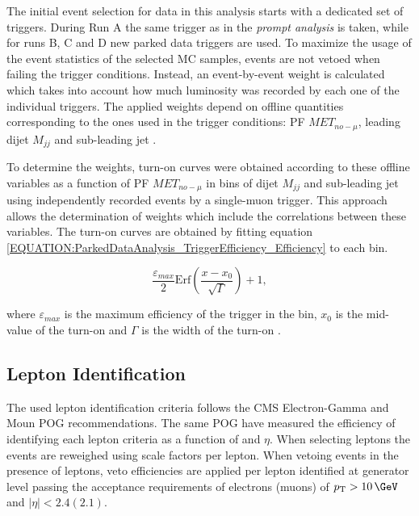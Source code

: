 
The initial event selection for data in this analysis starts with a dedicated set of triggers. During Run A the same trigger as in the \textit{prompt analysis} is taken, while for runs B, C and D new parked data triggers are used. To maximize the usage of the event statistics of the selected \gls{MC} samples, events are not vetoed  when failing the trigger conditions. Instead, an event-by-event weight is calculated which takes into account how much luminosity was recorded by each one of the individual triggers. The applied weights depend on offline quantities corresponding to the ones used in the trigger conditions: \gls{PF} $MET_{no-\mu}$, leading dijet $M_{jj}$ and sub-leading jet \pt. 

To determine the weights, turn-on curves were obtained according to these offline variables as a function of \gls{PF} $MET_{no-\mu}$ in bins of dijet $M_{jj}$ and sub-leading jet \pt using independently recorded events by a single-muon trigger. This approach allows the determination of weights which include the correlations between these variables. The turn-on curves are obtained by fitting equation \ref{EQUATION:ParkedDataAnalysis_TriggerEfficiency_Efficiency} to each bin.

\begin{equation}
\frac{\varepsilon_{max}}{2}\text{Erf}\left(\frac{x-x_{0}}{\sqrt{\Gamma}}\right)+1,
\label{EQUATION:ParkedDataAnalysis_TriggerEfficiency_Efficiency} 
\end{equation}

where $\varepsilon_{max}$ is the maximum efficiency of the trigger in the bin, $x_{0}$ is the mid-value of the turn-on and $\Gamma$ is the width of the turn-on \cite{ARTICLE:CMSVBFHiggsToInvAndZHCombination}.

\subsection{Lepton Identification}


The used lepton identification criteria follows the \gls{CMS} Electron-Gamma and Moun \gls{POG} recommendations. The same \gls{POG} have measured the efficiency of identifying each lepton criteria as a function of \pt and $\eta$. When selecting leptons the events are reweighed using scale factors per lepton. When vetoing events in the presence of leptons, veto efficiencies are applied per lepton identified at generator level passing the acceptance requirements of electrons (muons) of $\pt>10\,\GeV$ and $|\eta|<2.4(2.1)$.

